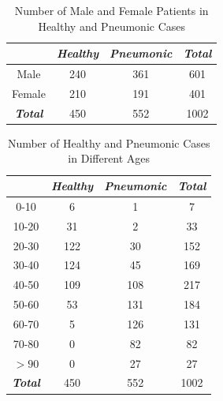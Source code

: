 \documentclass[runningheads]{llncs}
\begin{document}
\begin{table}[htb]
    \vspace{-0cm}
    \caption{Number of Male and Female Patients in Healthy and Pneumonic Cases}
    \vspace{-0cm}
    \begin{center}
    \begin{tabular}{|c|c|c|c|}
    \hline
    \textbf{\textit{}} & \textbf{\textit{Healthy}} & \textbf{\textit{Pneumonic}}& \textbf{\textit{Total}} \\
    \hline
    Male & 240 & 361 & 601\\
    Female & 210 & 191 & 401\\
    \hline
    \textbf{\textit{Total}} & 450 & 552 & 1002 \\
    
    \hline
    \end{tabular}
    \vspace{-0.0cm}
    \label{malefemale}
    \end{center}
    \vspace{-0.0cm}
    \end{table}

\begin{table}[htb]
    \vspace{-0cm}
    \caption{Number of Healthy and Pneumonic Cases in Different Ages}
    \vspace{-0cm}
    \begin{center}
    \begin{tabular}{|c|c|c|c|}
    \hline
    \textbf{\textit{}} & \textbf{\textit{Healthy}} & \textbf{\textit{Pneumonic}}& \textbf{\textit{Total}} \\
    \hline
    0-10 & 6 & 1 & 7\\
    10-20 & 31 & 2 & 33\\
    20-30 & 122 & 30 & 152\\
    30-40 & 124 & 45 & 169\\
    40-50 & 109 & 108 & 217\\
    50-60 & 53 & 131 & 184\\
    60-70 & 5 & 126 & 131\\
    70-80 & 0 & 82 & 82\\
    $>90$& 0 & 27 & 27\\
    \hline
    \textbf{\textit{Total}} & 450 & 552 & 1002 \\
    
    \hline
    \end{tabular}
    \vspace{-0.0cm}
    \label{differentages}
    \end{center}
    \vspace{-0.0cm}
    \end{table}
\end{document}
